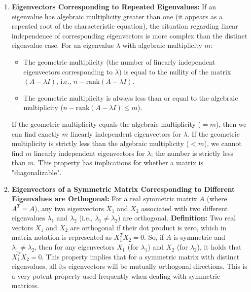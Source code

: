 \documentclass{article}
\begin{document}
\begin{enumerate}
    \item \textbf{Eigenvectors Corresponding to Repeated Eigenvalues:}
    If an eigenvalue has algebraic multiplicity greater than one (it appears as a repeated root of the characteristic equation), the situation regarding linear independence of corresponding eigenvectors is more complex than the distinct eigenvalue case.
    For an eigenvalue $\lambda$ with algebraic multiplicity $m$:
    \begin{itemize}
        \item The geometric multiplicity (the number of linearly independent eigenvectors corresponding to $\lambda$) is equal to the nullity of the matrix $(A - \lambda I)$, i.e., $n - \text{rank}(A - \lambda I)$.
        \item The geometric multiplicity is always less than or equal to the algebraic multiplicity ($n - \text{rank}(A - \lambda I) \leq m$).
    \end{itemize}
    If the geometric multiplicity equals the algebraic multiplicity ($= m$), then we can find exactly $m$ linearly independent eigenvectors for $\lambda$. If the geometric multiplicity is strictly less than the algebraic multiplicity ($< m$), we cannot find $m$ linearly independent eigenvectors for $\lambda$; the number is strictly less than $m$. This property has implications for whether a matrix is "diagonalizable".

    \vspace{0.5\baselineskip}

    \item \textbf{Eigenvectors of a Symmetric Matrix Corresponding to Different Eigenvalues are Orthogonal:}
    For a real symmetric matrix $A$ (where $A^T = A$), any two eigenvectors $X_1$ and $X_2$ associated with two different eigenvalues $\lambda_1$ and $\lambda_2$ (i.e., $\lambda_1 \neq \lambda_2$) are orthogonal.
    \textbf{Definition:} Two real vectors $X_1$ and $X_2$ are orthogonal if their dot product is zero, which in matrix notation is represented as $X_1^T X_2 = 0$.
    So, if $A$ is symmetric and $\lambda_1 \neq \lambda_2$, then for any eigenvectors $X_1$ (for $\lambda_1$) and $X_2$ (for $\lambda_2$), it holds that $X_1^T X_2 = 0$. This property implies that for a symmetric matrix with distinct eigenvalues, all its eigenvectors will be mutually orthogonal directions. This is a very potent property used frequently when dealing with symmetric matrices.

\end{enumerate}
\end{document}
